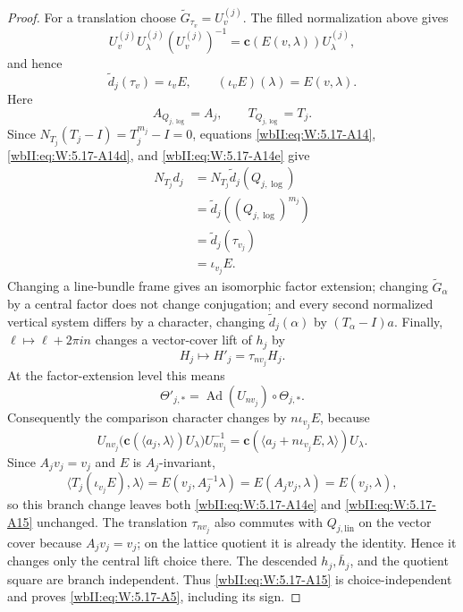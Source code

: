 \begin{proof}
For a translation choose
\(\widetilde G_{\tau_v}=U_v^{(j)}\).  The filled normalization above gives
\[
 U_v^{(j)}U_\lambda^{(j)}(U_v^{(j)})^{-1}
 =\mathbf c(E(v,\lambda))U_\lambda^{(j)},
\]
and hence
\[
 \widetilde d_j(\tau_v)=\iota_vE,\qquad
 (\iota_vE)(\lambda)=E(v,\lambda).
\tag{W.111}\label{wbII:eq:W:5.17-A14f}
\]
Here
\[
 A_{Q_{j,\log}}=A_j,\qquad T_{Q_{j,\log}}=T_j.
\]
Since \(N_{T_j}(T_j-I)=T_j^{m_j}-I=0\), equations
\eqref{wbII:eq:W:5.17-A14}, \eqref{wbII:eq:W:5.17-A14d}, and \eqref{wbII:eq:W:5.17-A14e} give
\[
\begin{aligned}
 N_{T_j}d_j
 &=N_{T_j}\widetilde d_j(Q_{j,\log})\\
 &=\widetilde d_j((Q_{j,\log})^{m_j})\\
 &=\widetilde d_j(\tau_{v_j})\\
 &=\iota_{v_j}E.
\end{aligned}
\tag{W.112}\label{wbII:eq:W:5.17-A15}
\]
Changing a line-bundle frame gives an isomorphic factor extension; changing
\(\widetilde G_\alpha\) by a central factor does not change conjugation; and
every second normalized vertical system differs by a character, changing
\(\widetilde d_j(\alpha)\) by \((T_\alpha-I)a\).  Finally,
\(\ell\mapsto\ell+2\pi in\) changes a vector-cover lift of \(h_j\) by
\[
 H_j\longmapsto H'_j=\tau_{nv_j}H_j.
\]
At the factor-extension level this means
\[
 \Theta'_{j,*}
 =\operatorname{Ad}(U_{nv_j})\circ\Theta_{j,*}.
\]
Consequently the comparison character changes by
\(n\iota_{v_j}E\), because
\[
 U_{nv_j}
 \bigl(\mathbf c(\langle a_j,\lambda\rangle)U_\lambda\bigr)
 U_{nv_j}^{-1}
 =
 \mathbf c(\langle a_j+n\iota_{v_j}E,\lambda\rangle)U_\lambda.
\]
Since \(A_jv_j=v_j\) and \(E\) is \(A_j\)-invariant,
\[
 \langle T_j(\iota_{v_j}E),\lambda\rangle
 =E(v_j,A_j^{-1}\lambda)
 =E(A_jv_j,\lambda)
 =E(v_j,\lambda),
\]
so this branch change leaves both \eqref{wbII:eq:W:5.17-A14e} and \eqref{wbII:eq:W:5.17-A15} unchanged.
The translation \(\tau_{nv_j}\) also commutes with
\(Q_{j,\mathrm{lin}}\) on the vector cover because \(A_jv_j=v_j\); on the
lattice quotient it is already the identity.  Hence it changes only the
central lift choice there.
The descended \(h_j,\bar h_j\), and the quotient square are branch
independent.  Thus \eqref{wbII:eq:W:5.17-A15} is choice-independent and proves \eqref{wbII:eq:W:5.17-A5},
including its sign.


\end{proof}
